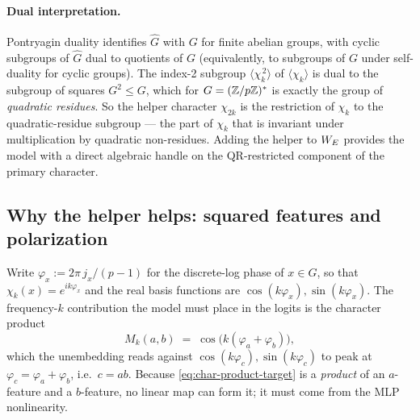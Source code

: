 \paragraph{Dual interpretation.}
Pontryagin duality identifies $\widehat{G}$ with $G$ for finite abelian
groups, with cyclic subgroups of $\widehat{G}$ dual to quotients of $G$
(equivalently, to subgroups of $G$ under self-duality for cyclic groups).
The index-2 subgroup $\langle \chi_k^{\,2} \rangle$ of $\langle \chi_k
\rangle$ is dual to the subgroup of squares $G^2 \le G$, which for
$G = (\mathbb{Z}/p\mathbb{Z})^*$ is exactly the group of \emph{quadratic residues}. So
the helper character $\chi_{2k}$ is the restriction of $\chi_k$ to the
quadratic-residue subgroup --- the part of $\chi_k$ that is invariant
under multiplication by quadratic non-residues. Adding the helper to
$W_E$ provides the model with a direct algebraic handle on the
QR-restricted component of the primary character.

\subsection{Why the helper helps: squared features and polarization}
\label{subsec:harmonic-mechanism}

Write $\varphi_x := 2\pi\, j_x / (p-1)$ for the discrete-log phase of
$x \in G$, so that $\chi_k(x) = e^{i k \varphi_x}$ and the real basis
functions are $\cos(k\varphi_x), \sin(k\varphi_x)$. The frequency-$k$
contribution the model must place in the logits is the character product
\begin{equation}
  M_k(a,b) \;=\; \cos\bigl(k(\varphi_a + \varphi_b)\bigr),
  \label{eq:char-product-target}
\end{equation}
which the unembedding reads against $\cos(k\varphi_c), \sin(k\varphi_c)$ to
peak at $\varphi_c = \varphi_a + \varphi_b$, i.e.\ $c = ab$. Because
\eqref{eq:char-product-target} is a \emph{product} of an $a$-feature and a
$b$-feature, no linear map can form it; it must come from the MLP
nonlinearity.

